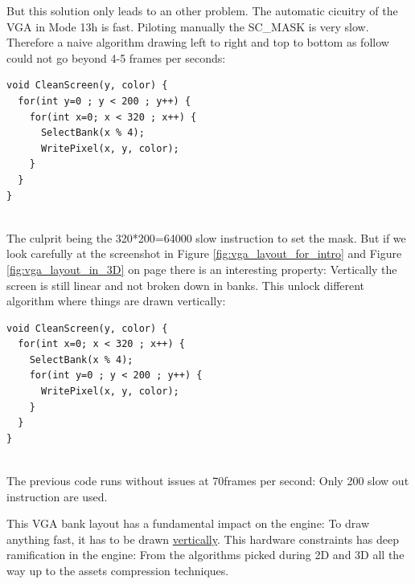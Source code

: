 \documentclass[book.tex]{subfiles}
\begin{document}
\par
But this solution only leads to an other problem. The automatic cicuitry of the VGA in Mode 13h is fast. Piloting manually the SC\_MASK is very slow. Therefore a naive algorithm drawing left to right and top to bottom as follow could not go beyond 4-5 frames per seconds:\\
\begin{verbatim}
void CleanScreen(y, color) {
  for(int y=0 ; y < 200 ; y++) {
    for(int x=0; x < 320 ; x++) {
      SelectBank(x % 4);
      WritePixel(x, y, color);   
    }
  }
}
\end{verbatim}\\
The culprit being the 320*200=64000 slow instruction to set the mask. But if we look carefully at the screenshot in Figure \ref{fig:vga_layout_for_intro} and Figure \ref{fig:vga_layout_in_3D} on page \pageref{fig:vga_layout_in_3D} there is an interesting property: Vertically the screen is still linear and not broken down in banks. This unlock different algorithm where things are drawn vertically:\\

\begin{verbatim}
void CleanScreen(y, color) {
  for(int x=0; x < 320 ; x++) {
    SelectBank(x % 4);
    for(int y=0 ; y < 200 ; y++) {
      WritePixel(x, y, color);   
    }
  }
}
\end{verbatim}\\
The previous code runs without issues at 70frames per second: Only 200 slow out instruction are used.\\
\par
This VGA bank layout has a fundamental impact on the engine: To draw anything fast, it has to be drawn \underline{vertically}. This hardware constraints has deep ramification in the engine: From the algorithms picked during 2D and 3D all the way up to the assets compression techniques.\\
\end{document}
